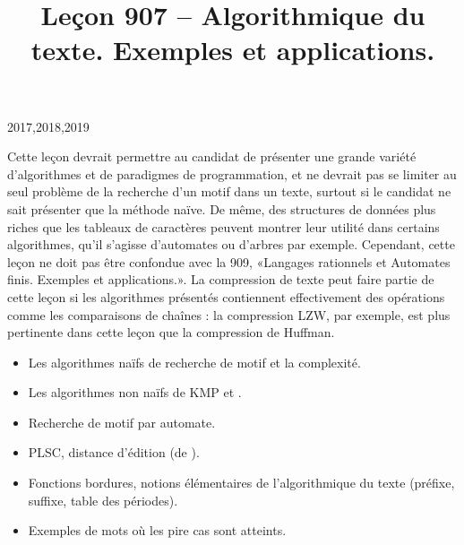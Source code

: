 \documentclass{agregfiche}
\title{Leçon 907 -- Algorithmique du texte. Exemples et applications.}
\begin{document}
\maketitle

\secrapports

\begin{rapport}{2017,2018,2019}

    Cette leçon devrait permettre au candidat de présenter une grande variété d’algorithmes et de paradigmes de programmation, et ne devrait pas se limiter au seul problème de la recherche d’un motif dans un texte, surtout si le candidat ne sait présenter que la méthode naïve. De même, des structures de données plus riches que les tableaux de caractères peuvent montrer leur utilité dans certains algorithmes, qu’il s’agisse d’automates ou d’arbres par exemple. Cependant, cette leçon ne doit pas être confondue avec la 909, «Langages rationnels et Automates finis. Exemples et applications.». La compression de texte peut faire partie de cette leçon si les algorithmes présentés contiennent effectivement des opérations comme les comparaisons de chaînes : la compression LZW, par exemple, est plus pertinente dans cette leçon que la compression de Huffman.

\end{rapport}

\secindispensables

\begin{itemize}
    \item Les algorithmes naïfs de recherche de motif et la complexité.
    \item Les algorithmes non naïfs de KMP et .
    \item Recherche de motif par automate.

\end{itemize}

\secasavoir
\begin{itemize}

	\item PLSC, distance d'édition (de ).
	\item Fonctions bordures, notions élémentaires de l'algorithmique du texte (préfixe, suffixe, table des périodes).
	\item Exemples de mots où les pire cas sont atteints.
\end{itemize}

\secidees
\end{document}
